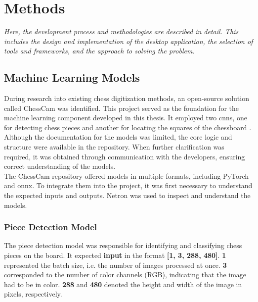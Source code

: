 \chapter{Methods}
\label{chp:methods}

\begin{center}
    \textit{Here, the development process and methodologies are described in detail. This includes the design and implementation of the desktop application, the selection of tools and frameworks, and the approach to solving the problem.}
\end{center}

\section{Machine Learning Models}
\label{sec:ml-models}

During research into existing chess digitization methods, an open-source solution called ChessCam was identified. This project served as the foundation for the machine learning component developed in this thesis. It employed two \glspl{cnn}, one for detecting chess pieces and another for locating the squares of the chessboard \cite{github:chesscam}. \\

Although the documentation for the models was limited, the core logic and structure were available in the repository. When further clarification was required, it was obtained through communication with the developers, ensuring correct understanding of the models. \\

The ChessCam repository offered models in multiple formats, including PyTorch and \gls{onnx}. To integrate them into the project, it was first necessary to understand the expected inputs and outputs. Netron was used to inspect and understand the models. \\


\subsection{Piece Detection Model}
The piece detection model was responsible for identifying and classifying chess pieces on the board. It expected \textbf{input} in the format \textbf{[1, 3, 288, 480]}. \textbf{1} represented the batch size, i.e. the number of images processed at once. \textbf{3} corresponded to the number of color channels (RGB), indicating that the image had to be in color. \textbf{288} and \textbf{480} denoted the height and width of the image in pixels, respectively. \\

